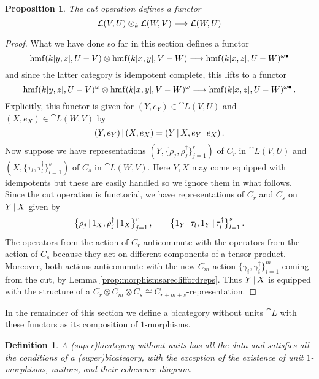 \documentclass[english,letter paper,12pt,leqno]{article}
\newtheorem{proposition}[theorem]{Proposition}
\theoremstyle{example}
\newtheorem{definition}[theorem]{Definition}
\numberwithin{equation}{section}
\def\be{\begin{equation}}
\def\ee{\end{equation}}
\DeclareMathOperator{\hmf}{hmf}
\begin{document}
\begin{proposition}\label{prop:cutisafunctor} The cut operation defines a functor
\be\label{eq:cutisafunctor}
\cat{L}(V,U) \otimes_k \cat{L}(W,V) \lto \cat{L}(W, U)
\ee
\end{proposition}
\begin{proof}
What we have done so far in this section defines a functor
\[
\hmf( k[y,z], U - V ) \otimes \hmf( k[x,y], V - W ) \lto \hmf( k[x,z], U - W )^{\omega \bullet}
\]
and since the latter category is idempotent complete, this lifts to a functor
\[
\hmf( k[y,z], U - V )^{\omega} \otimes \hmf( k[x,y], V - W )^{\omega} \lto \hmf( k[x,z], U - W )^{\omega \bullet}\,.
\]
Explicitly, this functor is given for $(Y,e_Y) \in \cat{L}(V,U)$ and $(X,e_X) \in \cat{L}(W,V)$ by
\[
(Y, e_Y) \,|\, (X, e_X) = (Y \,|\, X, e_Y \,|\, e_X)\,.
\]
Now suppose we have representations $( Y, \{ \rho_j, \rho_j^\dagger \}_{j=1}^r )$ of $C_r$ in $\cat{L}(V,U)$ and $( X, \{ \tau_l, \tau^\dagger_l \}_{l=1}^s )$ of $C_s$ in $\cat{L}(W,V)$. Here $Y,X$ may come equipped with idempotents but these are easily handled so we ignore them in what follows. Since the cut operation is functorial, we have representations of $C_r$ and $C_s$ on $Y \,|\, X$ given by
\[
\big\{ \rho_j \,|\, 1_X, \rho_j^\dagger \,|\, 1_X \big\}_{j=1}^r\,, \qquad \big\{ 1_Y \,|\, \tau_l, 1_Y \,|\, \tau_l^\dagger \big\}_{l=1}^s\,.
\]
The operators from the action of $C_r$ anticommute with the operators from the action of $C_s$ because they act on different components of a tensor product. Moreover, both actions anticommute with the new $C_m$ action $\{ \gamma_i, \gamma_i^\dagger \}_{i=1}^m$ coming from the cut, by Lemma \ref{prop:morphismsarecliffordreps}. Thus $Y \,|\, X$ is equipped with the structure of a $C_r \otimes C_m \otimes C_s \cong C_{r+m+s}$-representation.
\end{proof}

In the remainder of this section we define a bicategory without units $\cat{L}$ with these functors as its composition of $1$-morphisms.

\begin{definition} A \textsl{(super)bicategory without units} has all the data and satisfies all the conditions of a (super)bicategory, with the exception of the existence of unit $1$-morphisms, unitors, and their coherence diagram.
\end{definition}
\end{document}
